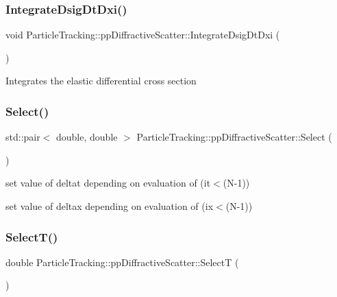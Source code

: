 \subsubsection{\texorpdfstring{Integrate\+Dsig\+Dt\+Dxi()}{IntegrateDsigDtDxi()}}
{\footnotesize\ttfamily void Particle\+Tracking\+::pp\+Diffractive\+Scatter\+::\+Integrate\+Dsig\+Dt\+Dxi (\begin{DoxyParamCaption}{ }\end{DoxyParamCaption})}

Integrates the elastic differential cross section \mbox{\label{classParticleTracking_1_1ppDiffractiveScatter_a813e2437d113d3db8994e3301d07855e}} 
\subsubsection{\texorpdfstring{Select()}{Select()}}
{\footnotesize\ttfamily std\+::pair$<$ double, double $>$ Particle\+Tracking\+::pp\+Diffractive\+Scatter\+::\+Select (\begin{DoxyParamCaption}{ }\end{DoxyParamCaption})}

set value of deltat depending on evaluation of (it$<$(N-\/1))

set value of deltax depending on evaluation of (ix$<$(N-\/1)) \mbox{\label{classParticleTracking_1_1ppDiffractiveScatter_ab76465efcf0e83555243d73f93a7049b}} 
\subsubsection{\texorpdfstring{Select\+T()}{SelectT()}}
{\footnotesize\ttfamily double Particle\+Tracking\+::pp\+Diffractive\+Scatter\+::\+SelectT (\begin{DoxyParamCaption}{ }\end{DoxyParamCaption})}



